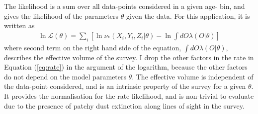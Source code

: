  The likelihood is a sum over all data-points considered in a given age-\feh{} bin, and gives the likelihood of the parameters $\theta$ given the data. For this application, it is written as
 \begin{multline}
 \ln \mathcal{L}(\theta) = \sum_{i} \left[ \ln \nu_{*}(X_i, Y_i, Z_i|\theta)- \ln \int dO \lambda(O|\theta) \right]
 \label{eq:likelihood}
 \end{multline}
 where second term on the right hand side of the equation, $ \int dO \lambda(O|\theta)$, describes the effective volume of the survey. I drop the other factors in the rate in Equation (\ref{eq:rate}) in the argument of the logarithm, because the other factors do not depend on the model parameters $\theta$. The effective volume is independent of the data-point considered, and is an intrinsic property of the survey for a given $\theta$. It provides the normalisation for the rate likelihood, and is non-trivial to evaluate due to the presence of patchy dust extinction along lines of sight in the survey.

